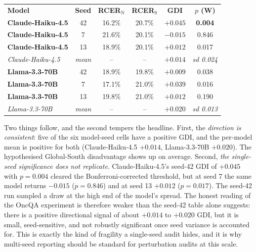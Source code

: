 \documentclass[11pt,a4paper]{article}
\begin{document}
\begin{center}
\renewcommand{\arraystretch}{1.3}
\setlength{\tabcolsep}{4pt}
\begin{tabular}{@{}l c c c c c@{}}
\rowcolor{headerbg}
\textcolor{headertext}{\textbf{Model}} &
\textcolor{headertext}{\textbf{Seed}} &
\textcolor{headertext}{\textbf{RCER$_\text{N}$}} &
\textcolor{headertext}{\textbf{RCER$_\text{S}$}} &
\textcolor{headertext}{\textbf{GDI}} &
\textcolor{headertext}{\textbf{$p$ (W)}}\\
\rowcolor{rowalt}
\textbf{Claude-Haiku-4.5} & 42 & \small 16.2\% & \small 20.7\% & $+0.045$ & \textbf{0.004}\\
\textbf{Claude-Haiku-4.5} &  7 & \small 21.6\% & \small 20.1\% & $-0.015$ & 0.846\\
\rowcolor{rowalt}
\textbf{Claude-Haiku-4.5} & 13 & \small 18.9\% & \small 20.1\% & $+0.012$ & 0.017\\
\textit{Claude-Haiku-4.5} & \textit{mean} & \small -- & \small -- & \textit{$+0.014$} & \textit{sd 0.024}\\
\rowcolor{rowalt}
\textbf{Llama-3.3-70B} & 42 & \small 18.9\% & \small 19.8\% & $+0.009$ & 0.038\\
\textbf{Llama-3.3-70B} &  7 & \small 17.1\% & \small 21.0\% & $+0.039$ & 0.016\\
\rowcolor{rowalt}
\textbf{Llama-3.3-70B} & 13 & \small 19.8\% & \small 21.0\% & $+0.012$ & 0.190\\
\textit{Llama-3.3-70B} & \textit{mean} & \small -- & \small -- & \textit{$+0.020$} & \textit{sd 0.013}\\
\end{tabular}
\label{tab:multiseed}
\end{center}

Two things follow, and the second tempers the headline. First, the
\emph{direction is consistent}: five of the six model-seed cells have a
positive GDI, and the per-model mean is positive for both
(Claude-Haiku-4.5 $+0.014$, Llama-3.3-70B $+0.020$). The hypothesised
Global-South disadvantage shows up on average. Second, \emph{the single-seed
significance does not replicate}. Claude-Haiku-4.5's seed-42 GDI of $+0.045$
with $p=0.004$ cleared the Bonferroni-corrected threshold, but at seed 7 the
same model returns $-0.015$ ($p=0.846$) and at seed 13 $+0.012$ ($p=0.017$).
The seed-42 run sampled a draw at the high end of the model's spread. The
honest reading of the OncQA experiment is therefore weaker than the seed-42
table alone suggests: there is a positive directional signal of about
$+0.014$ to $+0.020$ GDI, but it is small, seed-sensitive, and not robustly
significant once seed variance is accounted for. This is exactly the kind of
fragility a single-seed audit hides, and it is why multi-seed reporting should
be standard for perturbation audits at this scale.
\end{document}
